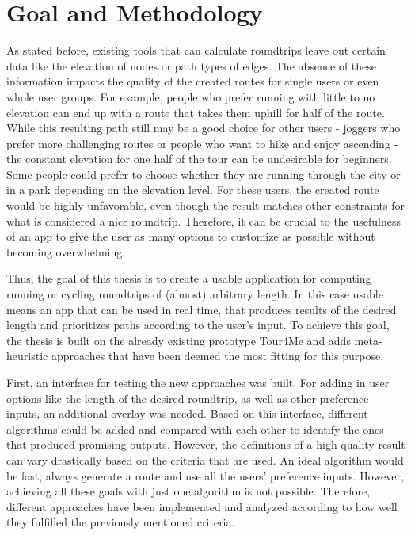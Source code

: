 


\section{Goal and Methodology}
\label{sec:goal}

As stated before, existing tools that can calculate roundtrips leave out certain data like the elevation of nodes or path types of edges.
The absence of these information impacts the quality of the created routes for single users or even whole user groups. 
For example, people who prefer running with little to no elevation can end up with a route that takes them uphill for half of the route.
While this resulting path still may be a good choice for other users - joggers who prefer more challenging routes or people who want to hike and enjoy ascending - the constant elevation for one half of the tour can be undesirable for beginners.
Some people could prefer to choose whether they are running through the city or in a park depending on the elevation level.
For these users, the created route would be highly unfavorable, even though the result matches other constraints for what is considered a nice roundtrip.
Therefore, it can be crucial to the usefulness of an app to give the user as many options to customize as possible without becoming overwhelming. 


Thus, the goal of this thesis is to create a usable application for computing running or cycling roundtrips of (almost) arbitrary length. 
In this case usable means an app that can be used in real time, that produces results of the desired length and prioritizes paths according to the user's input. 
To achieve this goal, the thesis is built on the already existing prototype Tour4Me \cite{buchin_tour4me_2022} and adds meta-heuristic approaches that have been deemed the most fitting for this purpose. 

First, an interface for testing the new approaches was built. 
For adding in user options like the length of the desired roundtrip, as well as other preference inputs, an additional overlay was needed.
Based on this interface, different algorithms could be added and compared with each other to identify the ones that produced promising outputs.
However, the definitions of a high quality result can vary drastically based on the criteria that are used. 
An ideal algorithm would be fast, always generate a route and use all the users' preference inputs.
However, achieving all these goals with just one algorithm is not possible. 
Therefore, different approaches have been implemented and analyzed according to how well they fulfilled the previously mentioned criteria. 

